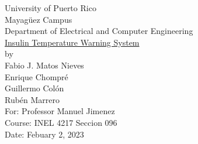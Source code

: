 \begin{titlepage}
  \begin{center}
    \large{University of Puerto Rico\\
    Mayagüez Campus\\
    \vspace{\baselineskip}
    Department of Electrical and Computer Engineering\\}
    \vspace{6cm}
    \Huge{\underline{Insulin Temperature Warning System}\\}
    \vspace{0.5\baselineskip}
    \large by\\
    Fabio J. Matos Nieves\\
    Enrique Chompré\\
    Guillermo Colón\\
    Rubén Marrero\\
    \vspace{4cm}
    For: Professor Manuel Jimenez\\
    Course: INEL 4217 Seccion 096\\
    Date: Febuary 2, 2023\\
    \normalsize

  \end{center}
\end{titlepage}
